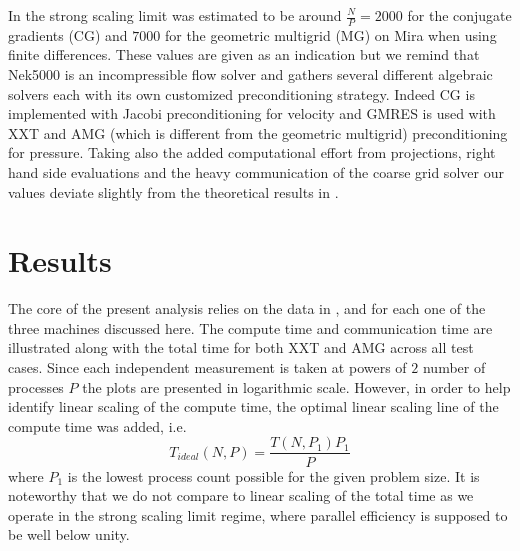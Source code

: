 \documentclass{sig-alternate}
\begin{document}
In \cite{fischer:scaling} the strong scaling limit  was estimated
to be around $\frac{N}{P}=2000$ for the conjugate gradients (CG) and %
$7000$ for the geometric multigrid (MG) on Mira when using finite
differences. These values are given as an indication %
but we remind that Nek5000 is an incompressible flow solver and gathers several different algebraic 
solvers each with its own customized preconditioning strategy. Indeed CG is implemented 
with Jacobi preconditioning for velocity and GMRES is used with XXT and AMG (which 
is different from the geometric multigrid) preconditioning for pressure. 
Taking also the added computational effort from projections, right hand side 
evaluations and the heavy communication of the coarse grid solver our values deviate slightly from the theoretical results in \cite{fischer:scaling}. 

\section{Results}


The core of the present analysis relies on the data in ,  and  for each one of the three machines discussed here. 
The compute time and
communication time are illustrated along with the total time for both XXT and AMG across all test cases. 
Since each independent measurement is taken at powers of $2$ number of processes $P$ 
the plots are presented in logarithmic scale. However, in order to help identify linear scaling of the
compute time, the optimal linear scaling line of the compute time was added, i.e.
$$
T_{ideal}(N,P)=\frac{T(N,P_1)P_1}{P}
$$
where $P_1$ is the lowest process count possible for the given problem size. It is noteworthy that we do not compare to linear scaling of the total time as we operate in the strong scaling limit regime, where parallel efficiency is supposed to be well below unity.
\end{document}
